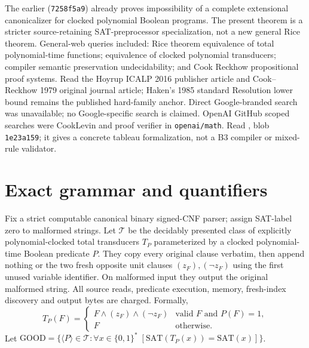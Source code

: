 \documentclass[11pt]{article}
\begin{document}
The earlier  (\texttt{7258f5a9}) already proves impossibility of a complete extensional canonicalizer for clocked polynomial Boolean programs. The present theorem is a stricter source-retaining SAT-preprocessor specialization, not a new general Rice theorem. General-web queries included: Rice theorem equivalence of total polynomial-time functions; equivalence of clocked polynomial transducers; compiler semantic preservation undecidability; and Cook Reckhow propositional proof systems. Read the Hoyrup ICALP 2016 publisher article and Cook--Reckhow 1979 original journal article; Haken's 1985 standard Resolution lower bound remains the published hard-family anchor. Direct Google-branded search was unavailable; no Google-specific search is claimed. OpenAI GitHub scoped searches were CookLevin and proof verifier in \texttt{openai/math}. Read , blob \texttt{1e23a159}; it gives a concrete tableau formalization, not a B3 compiler or mixed-rule validator.

\section*{Exact grammar and quantifiers}
Fix a strict computable canonical binary signed-CNF parser; assign SAT-label zero to malformed strings. Let $\mathcal T$ be the decidably presented class of explicitly polynomial-clocked total transducers $T_P$ parameterized by a clocked polynomial-time Boolean predicate $P$. They copy every original clause verbatim, then append nothing or the two fresh opposite unit clauses $(z_F),(\neg z_F)$ using the first unused variable identifier. On malformed input they output the original malformed string. All source reads, predicate execution, memory, fresh-index discovery and output bytes are charged. Formally,
\[
 T_P(F)=\begin{cases}F\wedge(z_F)\wedge(\neg z_F)&
 \text{valid $F$ and $P(F)=1$},\\
 F&\text{otherwise}.\end{cases}
\]
Let $\mathrm{GOOD}=\{\langle P\rangle\in\mathcal T:
\forall x\in\{0,1\}^{*}\;[\mathrm{SAT}(T_P(x))=\mathrm{SAT}(x)]\}$.
\end{document}
